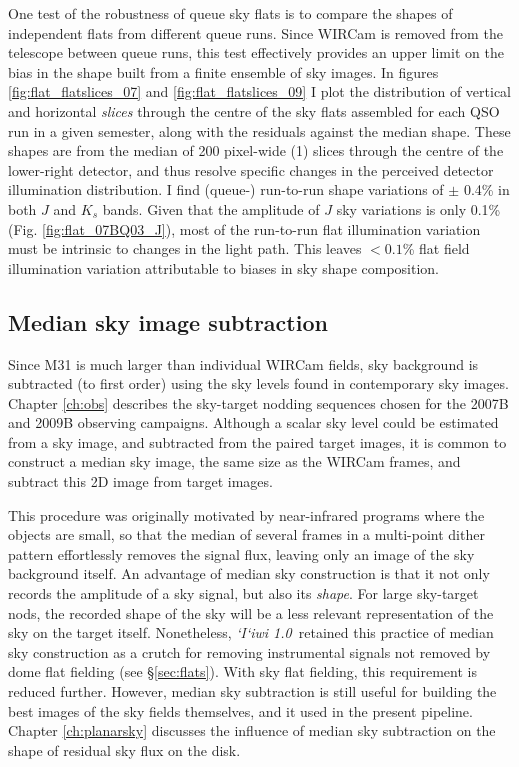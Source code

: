 \documentclass[iop]{emulateapj}
\newcommand{\sw}[1]{\textit{#1}} %
\newcommand{\iiwione}{\sw{`I`iwi 1.0}}
\begin{document}
One test of the robustness of queue sky flats is to compare the shapes of independent flats from different queue runs. Since WIRCam is removed from the telescope between queue runs, this test effectively provides an upper limit on the bias in the shape built from a finite ensemble of sky images. In figures \ref{fig:flat_flatslices_07} and \ref{fig:flat_flatslices_09} I plot the distribution of vertical and horizontal \emph{slices} through the centre of the sky flats assembled for each QSO run in a given semester, along with the residuals against the median shape. These shapes are from the median of 200 pixel-wide (1\arcmin) slices through the centre of the lower-right detector, and thus resolve specific changes in the perceived detector illumination distribution. I find (queue-) run-to-run shape variations of $\pm$ 0.4\% in both $J$ and $K_s$ bands. Given that the amplitude of $J$ sky variations is only 0.1\% (Fig. \ref{fig:flat_07BQ03_J}), most of the run-to-run flat illumination variation must be intrinsic to changes in the light path. This leaves $<0.1$\% flat field illumination variation attributable to biases in sky shape composition.

\subsection{Median sky image subtraction} %
\label{sec:mediansky}

Since M31 is much larger than individual WIRCam fields, sky background is subtracted (to first order) using the sky levels found in contemporary sky images. Chapter \ref{ch:obs} describes the sky-target nodding sequences chosen for the 2007B and 2009B observing campaigns. Although a scalar sky level could be estimated from a sky image, and subtracted from the paired target images, it is common to construct a median sky image, the same size as the WIRCam frames, and subtract this 2D image from target images.

This procedure was originally motivated by near-infrared programs where the objects are small, so that the median of several frames in a multi-point dither pattern effortlessly removes the signal flux, leaving only an image of the sky background itself. An advantage of median sky construction is that it not only records the amplitude of a sky signal, but also its \emph{shape}. For large sky-target nods, the recorded shape of the sky will be a less relevant representation of the sky on the target itself. Nonetheless, \iiwione\ retained this practice of median sky construction as a crutch for removing instrumental signals not removed by dome flat fielding (see \S \ref{sec:flats}). With sky flat fielding, this requirement is reduced further. However, median sky subtraction is still useful for building the best images of the sky fields themselves, and it used in the present pipeline. Chapter \ref{ch:planarsky} discusses the influence of median sky subtraction on the shape of residual sky flux on the disk.
\end{document}
